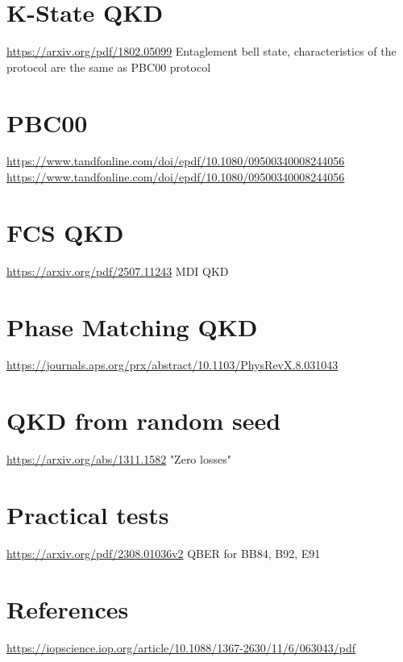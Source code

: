 \documentclass[12pt,a4paper]{article}
\begin{document}
\section{K-State QKD}
\url{https://arxiv.org/pdf/1802.05099} Entaglement bell state, characteristics of the protocol are the same as PBC00 protocol
\section{PBC00}
\url{https://www.tandfonline.com/doi/epdf/10.1080/09500340008244056}
\url{https://www.tandfonline.com/doi/epdf/10.1080/09500340008244056}
\section{FCS QKD}
\url{https://arxiv.org/pdf/2507.11243}
MDI QKD
\section{Phase Matching QKD}
\url{https://journals.aps.org/prx/abstract/10.1103/PhysRevX.8.031043}
\section{QKD from random seed}
\url{https://arxiv.org/abs/1311.1582}
"Zero losses" 
\section{Practical tests}
\url{https://arxiv.org/pdf/2308.01036v2}
QBER for BB84, B92, E91 \\
\section{References}
\url{https://iopscience.iop.org/article/10.1088/1367-2630/11/6/063043/pdf}
\printbibliography[heading=none] 
\end{document}
